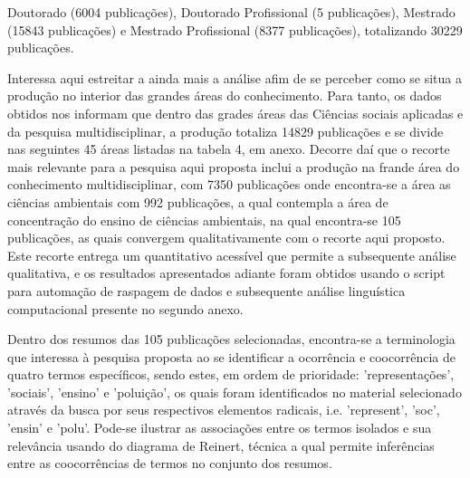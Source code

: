 \documentclass[
   article,       %
   11pt,          %
   oneside,       %
   a4paper,       %
   english,       %
   brazil,           %
   sumario=tradicional
   ]{abntex2}
\begin{document}
Doutorado (6004 publicações), Doutorado Profissional (5 publicações), Mestrado (15843 publicações) e Mestrado Profissional (8377 publicações), totalizando 30229 publicações.

Interessa aqui estreitar a ainda mais a análise afim de se perceber como se situa a produção no interior das grandes áreas do conhecimento. Para tanto, os dados obtidos nos informam que dentro das grades áreas das Ciências sociais aplicadas e da pesquisa multidisciplinar, a produção totaliza 14829 publicações e se divide nas seguintes 45 áreas listadas na tabela 4, em anexo. Decorre daí que o recorte mais relevante para a pesquisa aqui proposta inclui a produção na frande área do conhecimento multidisciplinar, com 7350 publicações onde encontra-se a área as ciências ambientais com 992 publicações, a qual contempla a área de concentração do ensino de ciências ambientais, na qual encontra-se 105 publicações, as quais convergem qualitativamente com o recorte aqui proposto. Este recorte entrega um quantitativo acessível que permite a subsequente análise qualitativa, e os resultados apresentados adiante foram obtidos usando o script para automação de raspagem de dados \cite{python_selenium} e subsequente análise linguística computacional \cite{Python_NLTK} presente no segundo anexo.

Dentro dos resumos das 105 publicações selecionadas, encontra-se a terminologia que interessa à pesquisa proposta ao se identificar a ocorrência e coocorrência de quatro termos específicos, sendo estes, em ordem de prioridade: 'representações', 'sociais', 'ensino' e 'poluição', os quais foram identificados no material selecionado através da busca por seus respectivos elementos radicais, i.e. 'represent', 'soc', 'ensin' e 'polu'. Pode-se ilustrar as associações entre os termos isolados e sua relevância usando do diagrama de Reinert, técnica a qual permite inferências entre as coocorrências de termos no conjunto dos resumos. 
\end{document}
